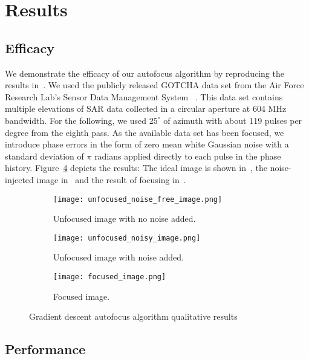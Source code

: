 \section{Results}\label{sec:results}

\subsection{Efficacy}

We demonstrate the efficacy of our autofocus algorithm by reproducing the
results in~\cite{ash2012autofocus}. We used the publicly released GOTCHA data
set from the Air Force Research Lab's Sensor Data Management System
~\cite{gotcha}. This data set contains multiple elevations of SAR data collected
in a circular aperture at 604 MHz bandwidth. For the following, we used
$25^{\circ}$ of azimuth with about 119 pulses per degree from the eighth pass.
As the available data set has been focused, we introduce phase errors in the
form of zero mean white Gaussian noise with a standard deviation of $\pi$
radians applied directly to each pulse in the phase history.
Figure~\ref{fig:efficacy} depicts the results: The ideal image is shown
in~, the noise-injected image in~ and the
result of focusing in~.

\begin{figure}
  \centering
  \begin{subfigure}{0.5\textwidth}
    \centering
    \texttt{[image: unfocused\_noise\_free\_image.png]}
    \caption{Unfocused image with no noise added.}
    \label{fig:ideal}
  \end{subfigure}
  \vfill
  \begin{subfigure}{0.5\textwidth}
    \centering
    \texttt{[image: unfocused\_noisy\_image.png]}
    \caption{Unfocused image with noise added.}
    \label{fig:unfocused}
  \end{subfigure}
  \vfill
  \begin{subfigure}{0.5\textwidth}
    \centering
    \texttt{[image: focused\_image.png]}
    \caption{Focused image.}
    \label{fig:focused}
  \end{subfigure}
  \vspace{5 mm}
  \caption{Gradient descent autofocus algorithm qualitative results}
  \label{fig:efficacy}
\end{figure}

\subsection{Performance}

